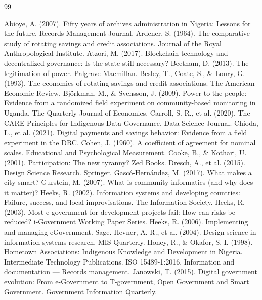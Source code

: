 \documentclass[review,onecolumn]{elsarticle}
\begin{document}
\begin{thebibliography}{99}

 Abioye, A. (2007). Fifty years of archives administration in Nigeria: Lessons for the future. Records Management Journal.
 Ardener, S. (1964). The comparative study of rotating savings and credit associations. Journal of the Royal Anthropological Institute.
 Atzori, M. (2017). Blockchain technology and decentralized governance: Is the state still necessary?
 Beetham, D. (2013). The legitimation of power. Palgrave Macmillan.
 Besley, T., Coate, S., \& Loury, G. (1993). The economics of rotating savings and credit associations. The American Economic Review.
 Björkman, M., \& Svensson, J. (2009). Power to the people: Evidence from a randomized field experiment on community-based monitoring in Uganda. The Quarterly Journal of Economics.
 Carroll, S. R., et al. (2020). The CARE Principles for Indigenous Data Governance. Data Science Journal.
 Chioda, L., et al. (2021). Digital payments and savings behavior: Evidence from a field experiment in the DRC.
 Cohen, J. (1960). A coefficient of agreement for nominal scales. Educational and Psychological Measurement.
 Cooke, B., \& Kothari, U. (2001). Participation: The new tyranny? Zed Books.
 Dresch, A., et al. (2015). Design Science Research. Springer.
 Gascó-Hernández, M. (2017). What makes a city smart?
 Gurstein, M. (2007). What is community informatics (and why does it matter)?
 Heeks, R. (2002). Information systems and developing countries: Failure, success, and local improvisations. The Information Society.
 Heeks, R. (2003). Most e-government-for-development projects fail: How can risks be reduced? i-Government Working Paper Series.
 Heeks, R. (2006). Implementing and managing eGovernment. Sage.
 Hevner, A. R., et al. (2004). Design science in information systems research. MIS Quarterly.
 Honey, R., \& Okafor, S. I. (1998). Hometown Associations: Indigenous Knowledge and Development in Nigeria. Intermediate Technology Publications.
 ISO 15489-1:2016. Information and documentation — Records management.
 Janowski, T. (2015). Digital government evolution: From e-Government to T-government, Open Government and Smart Government. Government Information Quarterly.

\end{thebibliography}
\end{document}
